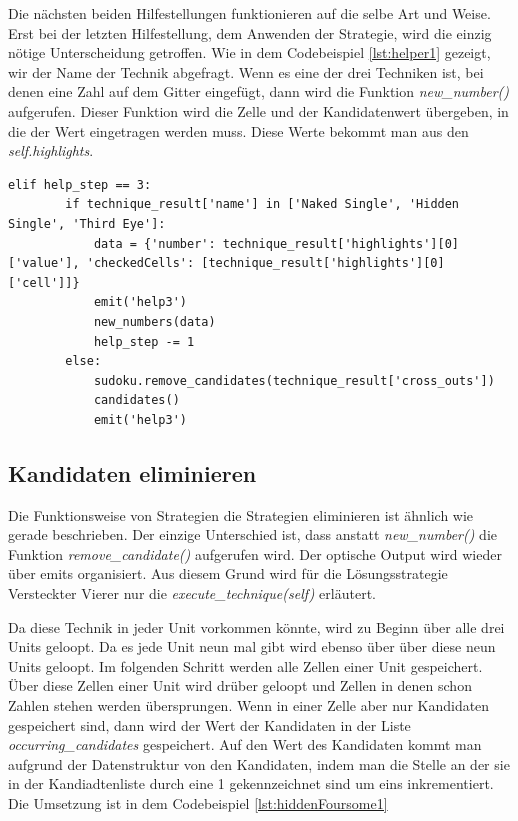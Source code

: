 Die nächsten beiden Hilfestellungen funktionieren auf die selbe Art und Weise. Erst bei der letzten Hilfestellung, dem Anwenden der Strategie, wird die einzig nötige Unterscheidung getroffen. Wie in dem Codebeispiel \ref{lst:helper1} gezeigt, wir der Name der Technik abgefragt. Wenn es eine der drei Techniken ist, bei denen eine Zahl auf dem Gitter eingefügt, dann wird die Funktion \textit{new\_number()} aufgerufen. Dieser Funktion wird die Zelle und der Kandidatenwert übergeben, in die der Wert eingetragen werden muss. Diese Werte bekommt man aus den \textit{self.highlights}.

\begin{lstlisting}[caption={Serverseitige Unterscheidung der zwei Arten von Techniken}, label={lst:helper1}]
	elif help_step == 3:
		if technique_result['name'] in ['Naked Single', 'Hidden Single', 'Third Eye']:
			data = {'number': technique_result['highlights'][0]['value'], 'checkedCells': [technique_result['highlights'][0]['cell']]}
			emit('help3')
			new_numbers(data)
			help_step -= 1
		else:
			sudoku.remove_candidates(technique_result['cross_outs'])
			candidates()
			emit('help3')
\end{lstlisting}


\subsection{Kandidaten eliminieren}

Die Funktionsweise von Strategien die Strategien eliminieren ist ähnlich wie gerade beschrieben. Der einzige Unterschied ist, dass anstatt \textit{new\_number()} die Funktion \textit{remove\_candidate()} aufgerufen wird. Der optische Output wird wieder über emits organisiert. Aus diesem Grund wird für die Lösungsstrategie Versteckter Vierer nur die \textit{execute\_technique(self)} erläutert. 

Da diese Technik in jeder Unit vorkommen könnte, wird zu Beginn über alle drei Units geloopt. Da es jede Unit neun mal gibt wird ebenso über über diese neun Units geloopt. Im folgenden Schritt werden alle Zellen einer Unit gespeichert. Über diese Zellen einer Unit wird drüber geloopt und Zellen in denen schon Zahlen stehen werden übersprungen. Wenn in einer Zelle aber nur Kandidaten gespeichert sind, dann wird der Wert der Kandidaten in der Liste \textit{occurring\_candidates} gespeichert. Auf den Wert des Kandidaten kommt man aufgrund der Datenstruktur von den Kandidaten, indem man die Stelle an der sie in der Kandiadtenliste durch eine 1 gekennzeichnet sind um eins inkrementiert. Die Umsetzung ist in dem Codebeispiel \ref{lst:hiddenFoursome1}

